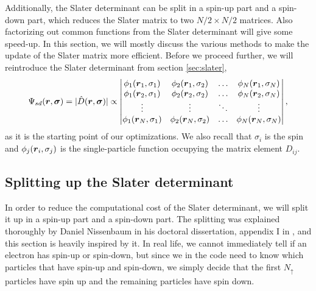 Additionally, the Slater determinant can be split in a spin-up part and a spin-down part, which reduces the Slater matrix to two $N/2\times N/2$ matrices. Also factorizing out common functions from the Slater determinant will give some speed-up. In this section, we will mostly discuss the various methods to make the update of the Slater matrix more efficient. Before we proceed further, we will reintroduce the Slater determinant from section \ref{sec:slater},
\begin{equation}
\Psi_{sd}(\boldsymbol{{r}},\boldsymbol{{\sigma}})=|\hat{D}(\boldsymbol{{r}},\boldsymbol{{\sigma}})|\propto
\begin{vmatrix}
\phi_1(\boldsymbol{r}_1,\sigma_1) & \phi_2(\boldsymbol{r}_1,\sigma_2) & \hdots & \phi_N(\boldsymbol{r}_1,\sigma_N)\\
\phi_1(\boldsymbol{r}_2,\sigma_1) & \phi_2(\boldsymbol{r}_2,\sigma_2) & \hdots & \phi_N(\boldsymbol{r}_2,\sigma_N)\\
\vdots & \vdots & \ddots & \vdots \\
\phi_1(\boldsymbol{r}_N,\sigma_1) & \phi_2(\boldsymbol{r}_N,\sigma_2) & \hdots & \phi_N(\boldsymbol{r}_N,\sigma_N)
\end{vmatrix},
\label{eq:generalslater}
\end{equation}
as it is the starting point of our optimizations. We also recall that $\sigma_i$ is the spin and $\phi_j(\boldsymbol{{r}}_i,\sigma_j)$ is the single-particle function occupying the matrix element $D_{ij}$.

\subsection{Splitting up the Slater determinant} \label{sec:splittingofslater}
In order to reduce the computational cost of the Slater determinant, we will split it up in a spin-up part and a spin-down part. The splitting was explained thoroughly by Daniel Nissenbaum in his doctoral dissertation, appendix I in \cite{nissenbaum_stochastic_2008}, and this section is heavily inspired by it. In real life, we cannot immediately tell if an electron has spin-up or spin-down, but since we in the code need to know which particles that have spin-up and spin-down, we simply decide that the first $N_{\uparrow}$ particles have spin up and the remaining particles have spin down. 

